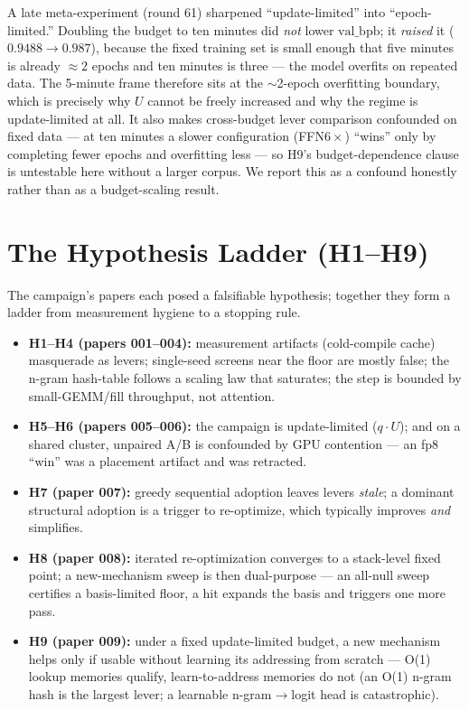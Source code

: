 \documentclass{article}
\newcommand{\valbpb}{\mathrm{val\_bpb}}
\begin{document}
A late meta-experiment (round 61) sharpened ``update-limited'' into ``epoch-limited.'' Doubling the budget to ten minutes did \emph{not} lower $\valbpb$; it \emph{raised} it ($0.9488\to0.987$), because the fixed training set is small enough that five minutes is already $\approx2$ epochs and ten minutes is three --- the model overfits on repeated data. The 5-minute frame therefore sits at the $\sim$2-epoch overfitting boundary, which is precisely why $U$ cannot be freely increased and why the regime is update-limited at all. It also makes cross-budget lever comparison confounded on fixed data --- at ten minutes a slower configuration (FFN$6\times$) ``wins'' only by completing fewer epochs and overfitting less --- so H9's budget-dependence clause is untestable here without a larger corpus. We report this as a confound honestly rather than as a budget-scaling result.

\section{The Hypothesis Ladder (H1--H9)}
\label{sec:hypotheses}

The campaign's papers each posed a falsifiable hypothesis; together they form a ladder from measurement hygiene to a stopping rule.

\begin{itemize}
    \item \textbf{H1--H4 (papers 001--004):} measurement artifacts (cold-compile cache) masquerade as levers; single-seed screens near the floor are mostly false; the n-gram hash-table follows a scaling law that saturates; the step is bounded by small-GEMM/fill throughput, not attention.
    \item \textbf{H5--H6 (papers 005--006):} the campaign is update-limited ($q\cdot U$); and on a shared cluster, unpaired A/B is confounded by GPU contention --- an fp8 ``win'' was a placement artifact and was retracted.
    \item \textbf{H7 (paper 007):} greedy sequential adoption leaves levers \emph{stale}; a dominant structural adoption is a trigger to re-optimize, which typically improves \emph{and} simplifies.
    \item \textbf{H8 (paper 008):} iterated re-optimization converges to a stack-level fixed point; a new-mechanism sweep is then dual-purpose --- an all-null sweep certifies a basis-limited floor, a hit expands the basis and triggers one more pass.
    \item \textbf{H9 (paper 009):} under a fixed update-limited budget, a new mechanism helps only if usable without learning its addressing from scratch --- O(1) lookup memories qualify, learn-to-address memories do not (an O(1) n-gram hash is the largest lever; a learnable n-gram$\to$logit head is catastrophic).
\end{itemize}
\end{document}
